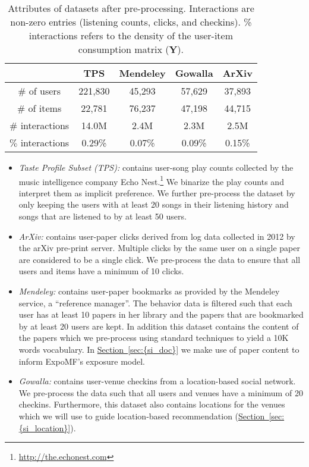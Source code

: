 \documentclass{sig-alternate-arxiv}
\begin{document}
\begin{table}
\centering
\begin{tabular}{ c c c c c  }
  \hline
   & \textbf{TPS} & \textbf{Mendeley} & \textbf{Gowalla} & \textbf{ArXiv} \\
   \hline
  \# of users & 221,830 & 45,293 & 57,629 & 37,893   \\
  \# of items & 22,781& 76,237 & 47,198 & 44,715 \\
  \# interactions & 14.0M &  2.4M & 2.3M & 2.5M\\
  $\%$ interactions & 0.29\% & 0.07\% & 0.09\% & 0.15\%\\
  \hline 
\end{tabular}
\caption{Attributes of datasets after pre-processing. Interactions are non-zero
entries (listening counts, clicks, and checkins). \% interactions refers to the
density of the user-item consumption matrix (${ \boldsymbol{Y}}$).}
\label{tab:data}
\end{table}

\begin{itemize}
\item \emph{Taste Profile Subset (TPS):} contains user-song play counts
collected by the music intelligence company Echo
Nest.\footnote{\url{http://the.echonest.com}} We binarize the play counts and
interpret them as implicit preference. We further pre-process the dataset by
only keeping the users with at least 20 songs in their listening history and
songs that are listened to by at least 50 users. 

\item \emph{ArXiv:} contains user-paper clicks derived from log data collected
in 2012 by the arXiv pre-print server. Multiple clicks
by the same user on a single paper are considered to be a single click. We
pre-process the data to ensure that all users and items have a minimum of 10
clicks. 

\item \emph{Mendeley:} contains user-paper bookmarks as provided by 
the Mendeley service, a ``reference
manager''. The behavior data is filtered such that each
user has at least 10 papers in her library and the papers that are bookmarked
by at least 20 users are kept. In addition this dataset contains the
content of the papers which we pre-process using standard techniques to
yield a 10K words vocabulary. In {\hyperref[sec:{si_doc}]{Section~\ref*{sec:{si_doc}}}} we make use of paper
content to inform ExpoMF's exposure model.  

\item \emph{Gowalla:} contains user-venue checkins from a location-based social
network. We pre-process the data such that all
users and venues have a minimum of 20 checkins. Furthermore, this dataset
also contains locations for the venues which we will use to guide 
location-based recommendation ({\hyperref[sec:{si_location}]{Section~\ref*{sec:{si_location}}}}).  
\end{itemize}
\end{document}
